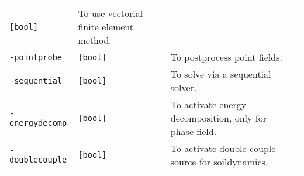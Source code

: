 \begin{longtable}[]{@{}lll@{}}
\begin{minipage}[t]{0.09\columnwidth}
\lstinline![bool]!\strut
\end{minipage} & \begin{minipage}[t]{0.56\columnwidth}\raggedright\strut
To use vectorial finite element method.\strut
\end{minipage}\tabularnewline
\begin{minipage}[t]{0.26\columnwidth}\raggedright\strut
\lstinline!-pointprobe!\strut
\end{minipage} & \begin{minipage}[t]{0.09\columnwidth}\raggedright\strut
\lstinline![bool]!\strut
\end{minipage} & \begin{minipage}[t]{0.56\columnwidth}\raggedright\strut
To postprocess point fields.\strut
\end{minipage}\tabularnewline
\begin{minipage}[t]{0.26\columnwidth}\raggedright\strut
\lstinline!-sequential!\strut
\end{minipage} & \begin{minipage}[t]{0.09\columnwidth}\raggedright\strut
\lstinline![bool]!\strut
\end{minipage} & \begin{minipage}[t]{0.56\columnwidth}\raggedright\strut
To solve via a sequential solver.\strut
\end{minipage}\tabularnewline
\begin{minipage}[t]{0.26\columnwidth}\raggedright\strut
\lstinline!-energydecomp!\strut
\end{minipage} & \begin{minipage}[t]{0.09\columnwidth}\raggedright\strut
\lstinline![bool]!\strut
\end{minipage} & \begin{minipage}[t]{0.56\columnwidth}\raggedright\strut
To activate energy decomposition, only for phase-field.\strut
\end{minipage}\tabularnewline
\begin{minipage}[t]{0.26\columnwidth}\raggedright\strut
\lstinline!-doublecouple!\strut
\end{minipage} & \begin{minipage}[t]{0.09\columnwidth}\raggedright\strut
\lstinline![bool]!\strut
\end{minipage} & \begin{minipage}[t]{0.56\columnwidth}\raggedright\strut
To activate double couple source for soildynamics.\strut
\end{minipage}\tabularnewline

\end{longtable}
